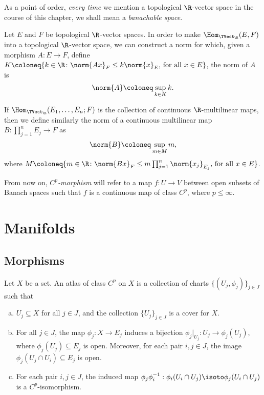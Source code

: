 As a point of order, \emph{every time} we mention a topological \(\R\)-vector
space in the course of this chapter, we shall mean a \emph{banachable space}.

\begin{definition}
\label{def:norm-morphism-TopVect}
Let \(E\) and \(F\) be topological \(\R\)-vector spaces. In order to make
\(\Hom_{\TVect_{\R}}(E, F)\) into a topological \(\R\)-vector space, we can
construct a norm for which, given a morphism \(A: E \to F\), define \(K \coloneq
\{k \in \R \colon \norm{Ax}_{F} \leq k \norm{x}_E \text{, for all } x \in E\}\), the
norm of \(A\) is
\[
  \norm{A} \coloneq \sup_{k \in K} k.
\]

If \(\Hom_{\TVect_{\R}}(E_1, \dots, E_n; F)\) is the collection of continuous
\(\R\)-multilinear maps, then we define similarly the norm of a continuous
multilinear map \(B: \prod_{j=1}^n E_j \to F\) as
\[
  \norm{B} \coloneq \sup_{m \in M} m,
\]
where \(M \coloneq \{m \in \R \colon \norm{Bx}_F \leq m \prod_{j=1}^n
\norm{x_j}_{E_j} \text{, for all } x \in E\}\).
\end{definition}

\begin{remark}
\label{rm:Cp-morphism}
From now on, \emph{\(C^p\)-morphism} will refer to a map \(f: U \to V\) between
open subsets of Banach spaces such that \(f\) is a continuous map of class
\(C^p\), where \(p \leq \infty\).
\end{remark}

\section{Manifolds}

\subsection{Morphisms}

\begin{definition}[Atlas]
\label{def:Cp-atlas}
Let \(X\) be a set. An atlas of class \(C^p\) on \(X\) is a collection of charts
\(\{(U_{j}, \phi_j)\}_{j \in J}\) such that
\begin{enumerate}[(a)]\setlength\itemsep{0em}
\item \(U_j \subseteq X\) for all \(j \in J\), and the collection \(\{U_{j}\}_{j
  \in J}\) is a cover for \(X\).

\item For all \(j \in J\), the map \(\phi_j: X \to E_j\) induces a bijection
  \(\phi_j|_{U_j}: U_j \to \phi_j(U_j)\), where \(\phi_j(U_j) \subseteq E_j\) is
  open. Moreover, for each pair \(i, j \in J\), the image \(\phi_j(U_j \cap U_i)
  \subseteq E_j\) is open.

\item For each pair \(i, j \in J\), the induced map \(\phi_j \phi_i^{-1}:
  \phi_i(U_i \cap U_j) \isoto \phi_j(U_i \cap U_j)\) is a \(C^p\)-isomorphism.
\end{enumerate}
\end{definition}

